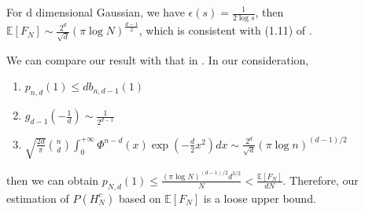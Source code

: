 \documentclass{article}
\def\E{\mathbb{E}}
\begin{document}
For d dimensional Gaussian, we have $\epsilon(s)=\frac{1}{2\log s}$,
then $\E[F_N]\sim \frac{2^d}{\sqrt{d}}(\pi \log N)^{\frac{d-1}{2}}$,
which is consistent with (1.11) of \cite{raynaud1970enveloppe}.

We can compare our result with that in \cite{kabluchko2020absorption}.
In our consideration,
\begin{enumerate}
    \item $p_{n,d}(1) \leq d b_{n,d-1}(1)$
    \item $g_{d-1}(-\frac{1}{d})\sim \frac{1}{2^{d-1}}$
    \item $\sqrt{\frac{2d}{\pi}} \binom{n}{d}
    \int_0^{+\infty} \Phi^{n-d}(x) \exp(-\frac{d}{2}x^2)dx
    \sim \frac{2^d}{\sqrt{d}}(\pi \log n)^{(d-1)/2}$
\end{enumerate}
then we can obtain $p_{N,d}(1) \leq \frac{(\pi \log N)^{(d-1)/2}d^{3/2}}{N }<\frac{\E[F_N]}{dN}$.
Therefore, our estimation of $P(H_N^c)$ based on $\E[F_N]$
is a loose upper bound.
\end{document}
